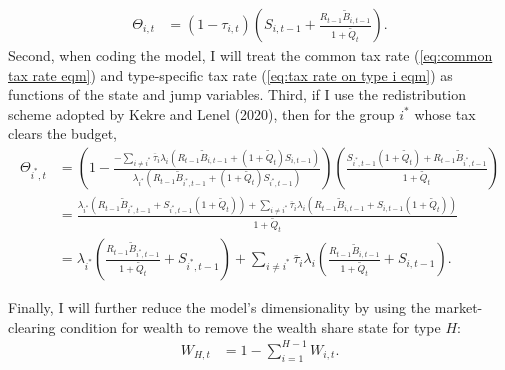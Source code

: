 \documentclass[12 pt, oneside]{article}
\theoremstyle{definition}
\theoremstyle{definition}
\theoremstyle{definition}
\begin{document}
\begin{align*}
  \Theta_{i, t} & = (1 - \tau_{i, t})\left(S_{i, t - 1} + \frac{R_{t - 1}\tilde{B}_{i, t - 1}}{1 + \tilde{Q}_t}\right).
\end{align*}
Second, when coding the model, I will treat the common tax rate (\ref{eq:common tax rate eqm}) and type-specific tax rate (\ref{eq:tax rate on type i eqm}) as functions of the state and jump variables. Third, if I use the redistribution scheme adopted by Kekre and Lenel (2020), then
for the group $i^*$ whose tax clears the budget,
\begin{align*}
  \Theta_{i^*, t} & = \left(1 - \frac{-\sum_{i \neq i^*} \overline{\tau}_i\lambda_i (R_{t - 1}\tilde{B}_{i, t - 1} + (1 + \tilde{Q}_t) S_{i, t - 1})}{\lambda_{i^*}(R_{t - 1}\tilde{B}_{i^*, t - 1} + (1 + \tilde{Q}_t)S_{i^*, t - 1})}\right)\left(\frac{S_{i^*, t - 1}(1 + \tilde{Q}_t) + R_{t - 1}\tilde{B}_{i^*, t - 1}}{1 + \tilde{Q}_t}\right)\\
                  & = \frac{\lambda_{i^*}(R_{t - 1}\tilde{B}_{i^*, t - 1} + S_{i^*, t - 1}(1 + \tilde{Q}_t)) + \sum_{i\neq i^*}\overline{\tau}_i\lambda_i(R_{t - 1}\tilde{B}_{i, t - 1} + S_{i, t - 1}(1 + \tilde{Q}_t))}{1 + \tilde{Q}_t}\\
                  & = \lambda_{i^*}\left(\frac{R_{t - 1}\tilde{B}_{i^*, t - 1}}{1 + \tilde{Q}_t} + S_{i^*, t - 1}\right) + \sum_{i\neq i^*}\overline{\tau}_i\lambda_i\left(\frac{R_{t - 1}\tilde{B}_{i, t - 1}}{1 + \tilde{Q}_t} + S_{i, t - 1}\right).
\end{align*}

Finally, I will further reduce the model's dimensionality by using the market-clearing condition for wealth to remove the wealth share state for type $H$:
\begin{align}
  W_{H, t} & = 1 - \sum_{i = 1}^{H - 1} W_{i, t}.
\end{align}
\end{document}
